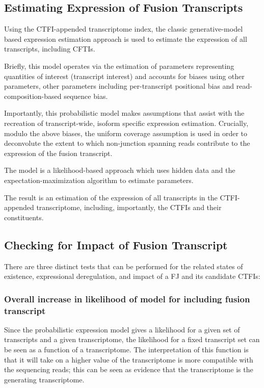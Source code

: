 \subsection{Estimating Expression of Fusion Transcripts}
Using the CTFI-appended transcriptome index, the classic generative-model based expression estimation approach is used to estimate the expression of all transcripts, including CFTIs.

Briefly, this model\cite{trapnell_transcript_2010}\cite{roberts_improving_2011}\cite{roberts_fragment_2013} operates via the estimation of parameters representing quantities of interest (transcript interest) and accounts for biases using other parameters, other parameters including per-transcript positional bias and read-composition-based sequence bias.

Importantly, this probabilistic model makes assumptions that assist with the recreation of transcript-wide, isoform specific expression estimation. Crucially, modulo the above biases, the uniform coverage assumption is used in order to deconvolute the extent to which non-junction spanning reads contribute to the expression of the fusion transcript.

The model is a likelihood-based approach which uses hidden data and the expectation-maximization\cite{tipping_mixtures_1999} algorithm to estimate parameters.

The result is an estimation of the expression of all transcripts in the CTFI-appended transcriptome, including, importantly, the CTFIs and their constituents.

\subsection{Checking for Impact of Fusion Transcript}

There are three distinct tests that can be performed for the related states of existence, expressional deregulation, and impact of a FJ and its candidate CTFIs:

\subsubsection{Overall increase in likelihood of model for including fusion transcript}

Since the probabilistic expression model gives a likelihood for a given set of transcripts and a given transcriptome, the likelihood for a fixed transcript set can be seen as a function of a transcriptome. The interpretation of this function is that it will take on a higher value of the transcriptome is more compatible with the sequencing reads; this can be seen as evidence that the transcriptome is the generating transcriptome.


